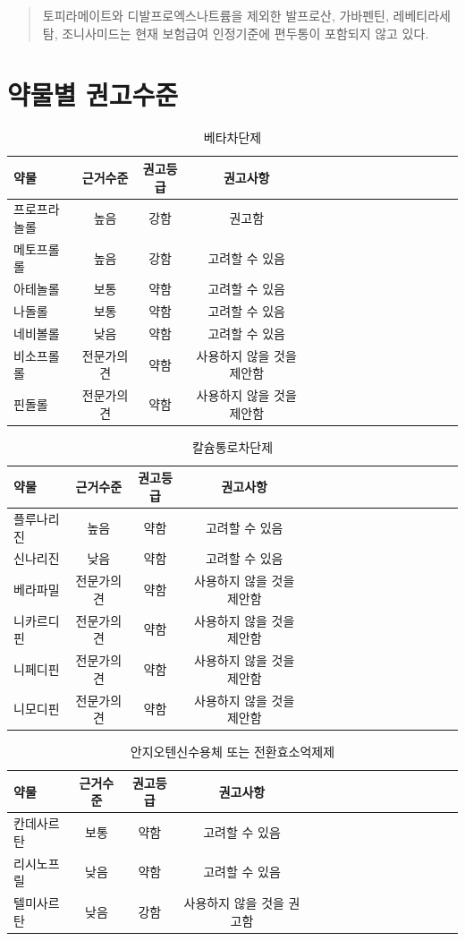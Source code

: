 \documentclass[]{book}
\begin{document}
\begin{quote}
토피라메이트와 디발프로엑스나트륨을 제외한 발프로산, 가바펜틴, 레베티라세탐, 조니사미드는 현재 보험급여 인정기준에 편두통이 포함되지 않고 있다.
\end{quote}

\hypertarget{section-5}{%
\section{약물별 권고수준}\label{section-5}}

\begin{longtable}{lccclccclccclccc}
\caption{\label{tab:unnamed-chunk-2}베타차단제}\\
\toprule
약물 & 근거수준 & 권고등급 & 권고사항\\
\midrule
프로프라놀롤 & 높음 & 강함 & 권고함\\
메토프롤롤 & 높음 & 강함 & 고려할 수 있음\\
아테놀롤 & 보통 & 약함 & 고려할 수 있음\\
나돌롤 & 보통 & 약함 & 고려할 수 있음\\
네비볼롤 & 낮음 & 약함 & 고려할 수 있음\\
\addlinespace
비소프롤롤 & 전문가의견 & 약함 & 사용하지 않을 것을 제안함\\
핀돌롤 & 전문가의견 & 약함 & 사용하지 않을 것을 제안함\\
\bottomrule
\end{longtable}

\begin{longtable}{lccclccclccclccc}
\caption{\label{tab:unnamed-chunk-3}칼슘통로차단제}\\
\toprule
약물 & 근거수준 & 권고등급 & 권고사항\\
\midrule
플루나리진 & 높음 & 약함 & 고려할 수 있음\\
신나리진 & 낮음 & 약함 & 고려할 수 있음\\
베라파밀 & 전문가의견 & 약함 & 사용하지 않을 것을 제안함\\
니카르디핀 & 전문가의견 & 약함 & 사용하지 않을 것을 제안함\\
니페디핀 & 전문가의견 & 약함 & 사용하지 않을 것을 제안함\\
\addlinespace
니모디핀 & 전문가의견 & 약함 & 사용하지 않을 것을 제안함\\
\bottomrule
\end{longtable}

\begin{longtable}{lccclccclccclccc}
\caption{\label{tab:unnamed-chunk-4}안지오텐신수용체 또는 전환효소억제제}\\
\toprule
약물 & 근거수준 & 권고등급 & 권고사항\\
\midrule
칸데사르탄 & 보통 & 약함 & 고려할 수 있음\\
리시노프릴 & 낮음 & 약함 & 고려할 수 있음\\
텔미사르탄 & 낮음 & 강함 & 사용하지 않을 것을 권고함\\
\bottomrule
\end{longtable}
\end{document}
